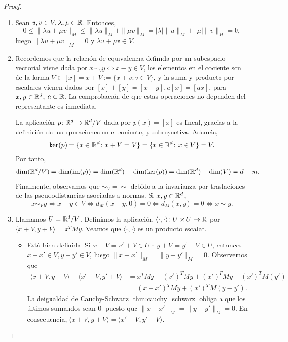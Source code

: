 \begin{proof}~
    \begin{enumerate}
        \item Sean $u, v \in V, \lambda, \mu \in \mathbb{R}$. Entonces,
        \[0 \le \|\lambda u + \mu v \|_M \le \|\lambda u \|_M+\|\mu v\|_M = |\lambda|\|u\|_M+|\mu|\|v\|_M = 0, \]
        luego $\|\lambda u + \mu v\|_M = 0$ y $\lambda u + \mu v \in V$.

        \item Recordemos que la relación de equivalencia definida por un subespacio vectorial viene dada por $x \sim_V y \iff x - y \in V$, los elementos en el cociente son de la forma $V \in [x] = x+ V := \{x+v \colon v \in V\}$, y la suma y producto por escalares vienen dados por $[x] + [y] = [x+y], a[x] = [ax]$, para $x,y \in \mathbb{R}^d$, $a \in \mathbb{R}$. La comprobación de que estas operaciones no dependen del representante es inmediata. 

        La aplicación $p\colon \mathbb{R}^d \to \mathbb{R}^d/V$ dada por $p(x) = [x]$ es lineal, gracias a la definición de las operaciones en el cociente, y sobreyectiva. Además,
        \[\ker(p) = \{x \in \mathbb{R}^d \colon x + V = V \} = \{x \in \mathbb{R}^d \colon x \in V  \} = V. \]
        Por tanto,
        \[ \dim(\mathbb{R}^d/V) = \dim(\operatorname{im}(p)) = \dim(\mathbb{R}^d) - \dim(\ker(p)) = \dim(\mathbb{R}^d) - \dim(V) = d - m.\]
        Finalmente, observamos que $\sim_{V} = \sim$ debido a la invarianza por traslaciones de las pseudodistancias asociadas a normas. Si $x,y \in \mathbb{R}^d$,
        \[ x \sim_{V} y \iff x-y \in V \iff d_M(x-y,0) = 0 \iff d_M(x,y) = 0  \iff x \sim y.\]

        \item Llamamos $U = \mathbb{R}^d/V$. Definimos la aplicación $\langle \cdot, \cdot \rangle \colon U \times U \to \mathbb{R}$ por $\langle x +V, y+V \rangle = x^TMy$. Veamos que $\langle \cdot, \cdot \rangle$ es un producto escalar.
        \begin{itemize}
            \item Está bien definida. Si $x+V = x'+V \in U$ e $y+V=y'+V \in U$, entonces $x-x' \in V, y-y' \in V$, luego $\|x-x'\|_M = \|y-y'\|_M = 0$. Observemos que
            \begin{align*}
            \langle x+V, y+V \rangle - \langle x' + V, y' + V \rangle &= x^TMy - (x')^TMy + (x')^TMy - (x')^TM(y') \\
                                &= (x - x')^TMy + (x')^TM(y - y').  
            \end{align*}
            La deigualdad de Cauchy-Schwarz \ref{thm:cauchy_schwarz} obliga a que los últimos sumandos sean 0, puesto que $\|x-x'\|_M = \|y-y'\|_M = 0$. En consecuencia, $\langle x+V, y+V \rangle = \langle x' + V, y' + V \rangle$.


\end{itemize}
\end{enumerate}
\end{proof}

